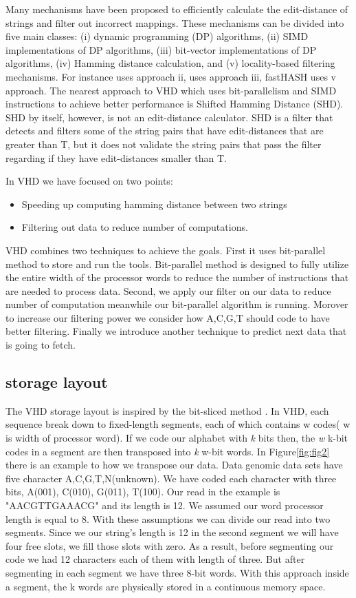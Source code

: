 Many mechanisms have been proposed to efficiently calculate the edit-distance of strings and filter out incorrect mappings. These mechanisms can be divided into five main classes: (i) dynamic programming (DP) algorithms, (ii) SIMD implementations of DP algorithms, (iii) bit-vector implementations of DP algorithms, (iv) Hamming distance calculation, and (v) locality-based filtering mechanisms. For instance \cite{swps3} uses approach ii, \cite{seqan} uses approach iii, fastHASH\cite{fasthash} uses v approach. The nearest approach to VHD which uses bit-parallelism and SIMD instructions to achieve better performance is Shifted Hamming Distance (SHD)\cite{shd}. SHD by itself, however, is not an edit-distance calculator. SHD is a filter that detects and filters some of the string pairs that have edit-distances that are greater than T, but it does not validate the string pairs that pass the filter regarding if they have edit-distances smaller than T.
  
In VHD we have focused on two points:
\begin{itemize}
\item Speeding up computing hamming distance between two strings
\item Filtering out data to reduce number of computations.
\end{itemize}
  
 VHD combines two techniques to achieve the goals. First it uses bit-parallel method to store and run the tools. Bit-parallel method is designed to fully utilize the entire width of the processor words to reduce the number of instructions that are needed to process data. Second, we apply  our filter on our data to reduce number of computation meanwhile our bit-parallel algorithm is running. Morover to increase our filtering power we consider how A,C,G,T should code to have better filtering. Finally we introduce another technique to predict next data that is going to fetch.
 
 \subsection{storage layout}
The VHD storage layout is inspired by the bit-sliced method \cite{O_Neil_1997}. In VHD, each sequence break down to fixed-length segments, each of which contains w codes( w is width of processor word). If we code our alphabet with \emph{k} bits then, the \emph{w} k-bit codes in a segment are then transposed into \emph{k} w-bit words. In Figure\ref{fig:fig2} there is an example to how we transpose our data. Data genomic data sets have five character A,C,G,T,N(unknown). We have coded each character with three bits, A(001), C(010), G(011), T(100). Our read in the example is "AACGTTGAAACG" and its length is 12. We assumed our word processor length is equal to 8. With these assumptions we can divide our read into two segments. Since we our string's length is 12 in the second segment we will have four free slots, we fill those slots with zero. As a result, before segmenting our code we had 12 characters each of them with length of three. But after segmenting in each segment we have three 8-bit words. With this approach inside a segment, the k words are physically stored in a continuous memory space.
 
  
  
  
  
  
  
